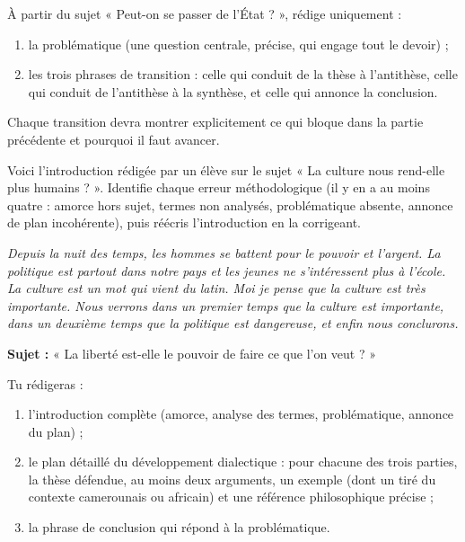 \documentclass[11pt]{article}
\newcounter{popsec}
\newcounter{popsub}
\newcommand{\courssub}[1]{%
  \stepcounter{popsub}%
  \par\vspace{9pt}\noindent{\popxbold\fontsize{11.5}{13}\selectfont\color{popink}{\color{poporange}\thepopsec.\thepopsub}\hspace{6pt}#1}\par\nopagebreak\vspace{4pt}
}
\begin{document}
\begin{exercice}
À partir du sujet « Peut-on se passer de l'État ? », rédige uniquement :

\begin{enumerate}
\item la problématique (une question centrale, précise, qui engage tout le devoir) ;
\item les trois phrases de transition : celle qui conduit de la thèse à l'antithèse, celle qui conduit de l'antithèse à la synthèse, et celle qui annonce la conclusion.
\end{enumerate}

Chaque transition devra montrer explicitement ce qui bloque dans la partie précédente et pourquoi il faut avancer.
\end{exercice}

\begin{exercice}
Voici l'introduction rédigée par un élève sur le sujet « La culture nous rend-elle plus humains ? ». Identifie chaque erreur méthodologique (il y en a au moins quatre : amorce hors sujet, termes non analysés, problématique absente, annonce de plan incohérente), puis réécris l'introduction en la corrigeant.

\emph{Depuis la nuit des temps, les hommes se battent pour le pouvoir et l'argent. La politique est partout dans notre pays et les jeunes ne s'intéressent plus à l'école. La culture est un mot qui vient du latin. Moi je pense que la culture est très importante. Nous verrons dans un premier temps que la culture est importante, dans un deuxième temps que la politique est dangereuse, et enfin nous conclurons.}
\end{exercice}

\courssub{Je me prépare au Bac}

\begin{exercice}
\textbf{Sujet :} « La liberté est-elle le pouvoir de faire ce que l'on veut ? »

Tu rédigeras :
\begin{enumerate}
\item l'introduction complète (amorce, analyse des termes, problématique, annonce du plan) ;
\item le plan détaillé du développement dialectique : pour chacune des trois parties, la thèse défendue, au moins deux arguments, un exemple (dont un tiré du contexte camerounais ou africain) et une référence philosophique précise ;
\item la phrase de conclusion qui répond à la problématique.
\end{enumerate}
\end{exercice}
\end{document}
